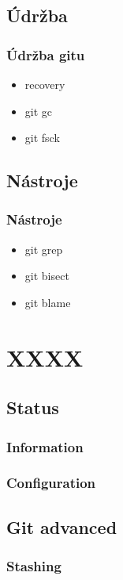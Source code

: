 \documentclass[pdftex]{beamer}
\begin{document}
\subsection{Údržba}

\begin{frame}
	\frametitle{Údržba gitu}
	\begin{itemize}
		\item recovery
		\item git gc
		\item git fsck
	\end{itemize}
\end{frame}

\subsection{Nástroje}

\begin{frame}
	\frametitle{Nástroje}
	\begin{itemize}
		\item git grep
		\item git bisect
		\item git blame
	\end{itemize}
\end{frame}


\section{XXXX}

\subsection{Status}


\begin{frame}
	\frametitle{Information}
\end{frame}


\begin{frame}
	\frametitle{Configuration}
\end{frame}


\subsection{Git advanced}

\begin{frame}
	\frametitle{Stashing}
\end{frame}
\end{document}
